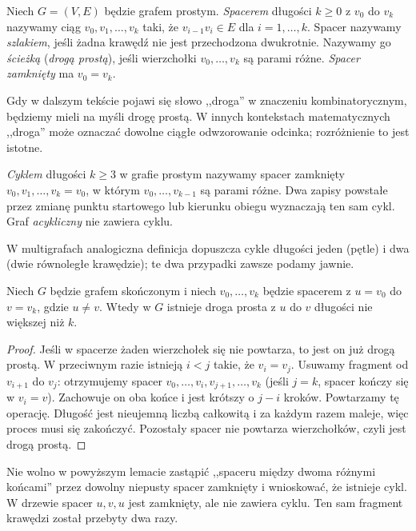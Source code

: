 \begin{definicja}
Niech $G=(V,E)$ będzie grafem prostym.
\emph{Spacerem} długości $k\ge0$ z $v_0$ do $v_k$
nazywamy ciąg $v_0,v_1,\ldots,v_k$ taki, że
$v_{i-1}v_i\in E$ dla $i=1,\ldots,k$.
Spacer nazywamy \emph{szlakiem}, jeśli żadna
krawędź nie jest przechodzona dwukrotnie.
Nazywamy go \emph{ścieżką} (\emph{drogą prostą}), jeśli
wierzchołki $v_0,\ldots,v_k$ są parami różne.
\emph{Spacer zamknięty} ma $v_0=v_k$.
\end{definicja}

Gdy w dalszym tekście pojawi się słowo ,,droga'' w znaczeniu
kombinatorycznym, będziemy mieli na myśli drogę prostą. W innych kontekstach matematycznych
,,droga'' może oznaczać dowolne ciągłe odwzorowanie odcinka;
rozróżnienie to jest istotne.

\begin{definicja}[Cykl]
\emph{Cyklem} długości $k\ge3$ w grafie prostym
nazywamy spacer zamknięty $v_0,v_1,\ldots,v_k=v_0$,
w którym $v_0,\ldots,v_{k-1}$ są parami różne.
Dwa zapisy powstałe przez zmianę punktu startowego
lub kierunku obiegu wyznaczają ten sam cykl.
Graf \emph{acykliczny} nie zawiera cyklu.
\end{definicja}

W multigrafach analogiczna definicja dopuszcza
cykle długości jeden (pętle) i dwa (dwie równoległe
krawędzie); te dwa przypadki zawsze podamy jawnie.

\begin{lemat}
Niech $G$ będzie grafem skończonym i niech
$v_0,\ldots,v_k$ będzie spacerem z $u=v_0$
do $v=v_k$, gdzie $u\ne v$. Wtedy w $G$
istnieje droga prosta z $u$ do $v$ długości
nie większej niż $k$.
\end{lemat}

\begin{proof}
Jeśli w spacerze żaden wierzchołek się nie powtarza,
to jest on już drogą prostą. W przeciwnym razie istnieją
$i<j$ takie, że $v_i=v_j$. Usuwamy fragment od
$v_{i+1}$ do $v_j$: otrzymujemy spacer
$v_0,\ldots,v_i,v_{j+1},\ldots,v_k$
(jeśli $j=k$, spacer kończy się w $v_i=v$).
Zachowuje on oba końce i jest krótszy o $j-i$ kroków.
Powtarzamy tę operację. Długość jest nieujemną liczbą
całkowitą i za każdym razem maleje, więc proces
musi się zakończyć. Pozostały spacer nie powtarza
wierzchołków, czyli jest drogą prostą.
\end{proof}

\begin{uwaga}
Nie wolno w powyższym lemacie zastąpić ,,spaceru między
dwoma różnymi końcami'' przez dowolny niepusty spacer
zamknięty i wnioskować, że istnieje cykl. W drzewie
spacer $u,v,u$ jest zamknięty, ale nie zawiera cyklu.
Ten sam fragment krawędzi został przebyty dwa razy.
\end{uwaga}


